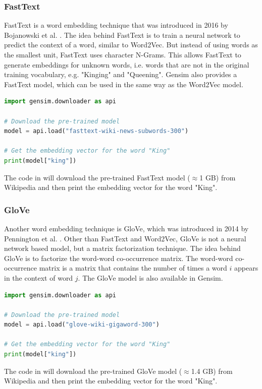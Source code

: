 \subsubsection{FastText}
FastText is a word embedding technique that was introduced in 2016 by Bojanowski et al. \cite{bojanowski2016enriching}.
The idea behind FastText is to train a neural network to predict the context of a word, similar to Word2Vec.
But instead of using words as the smallest unit, FastText uses character N-Grams.
This allows FastText to generate embeddings for unknown words, i.e. words that are not in the original training vocabulary, e.g. "Kinging" and "Queening".
Gensim also provides a FastText model, which can be used in the same way as the Word2Vec model.
\begin{lstlisting}[language=Python, caption={FastText example}, label={code:fasttext}]
import gensim.downloader as api

# Download the pre-trained model
model = api.load("fasttext-wiki-news-subwords-300")

# Get the embedding vector for the word "King"
print(model["king"])
\end{lstlisting}
The code in  will download the pre-trained FastText model ($\approx$1 GB) from Wikipedia and then print the embedding vector for the word "King".

\subsubsection{GloVe}
Another word embedding technique is GloVe, which was introduced in 2014 by Pennington et al. \cite{pennington2014glove}.
Other than FastText and Word2Vec, GloVe is not a neural network based model, but a matrix factorization technique.
The idea behind GloVe is to factorize the word-word co-occurrence matrix.
The word-word co-occurrence matrix is a matrix that contains the number of times a word $i$ appears in the context of word $j$.
The GloVe model is also available in Gensim.
\begin{lstlisting}[language=Python, caption={GloVe example}, label={code:glove}]
import gensim.downloader as api

# Download the pre-trained model
model = api.load("glove-wiki-gigaword-300")

# Get the embedding vector for the word "King"
print(model["king"])
\end{lstlisting}
The code in  will download the pre-trained GloVe model ($\approx$1.4 GB) from Wikipedia and then print the embedding vector for the word "King".

